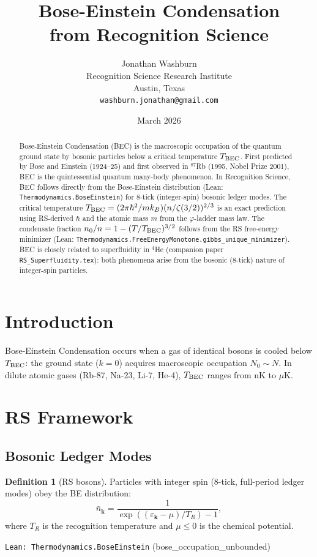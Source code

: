\documentclass[12pt,a4paper]{article}
\title{Bose-Einstein Condensation\\
from Recognition Science}
\author{Jonathan Washburn\\
Recognition Science Research Institute\\
Austin, Texas\\
\texttt{washburn.jonathan@gmail.com}}
\date{March 2026}
\theoremstyle{definition}
\newtheorem{definition}[theorem]{Definition}
\theoremstyle{remark}
\begin{document}
\maketitle

\begin{abstract}
Bose-Einstein Condensation (BEC) is the macroscopic occupation of the
quantum ground state by bosonic particles below a critical temperature
$T_{\rm BEC}$.  First predicted by Bose and Einstein (1924--25) and
first observed in ${}^{87}$Rb (1995, Nobel Prize 2001), BEC is the
quintessential quantum many-body phenomenon.  In Recognition Science,
BEC follows directly from the Bose-Einstein distribution (Lean:
\texttt{Thermodynamics.BoseEinstein}) for 8-tick (integer-spin) bosonic
ledger modes.  The critical temperature
$T_{\rm BEC} = (2\pi\hbar^2/mk_B)(n/\zeta(3/2))^{2/3}$ is an exact
prediction using RS-derived $\hbar$ and the atomic mass $m$ from the
$\varphi$-ladder mass law.  The condensate fraction
$n_0/n = 1 - (T/T_{\rm BEC})^{3/2}$ follows from the RS free-energy
minimizer (Lean: \texttt{Thermodynamics.FreeEnergyMonotone.gibbs\_unique\_minimizer}).
BEC is closely related to superfluidity in ${}^4$He (companion paper
\texttt{RS\_Superfluidity.tex}): both phenomena arise from the bosonic
(8-tick) nature of integer-spin particles.
\end{abstract}

\section{Introduction}

Bose-Einstein Condensation occurs when a gas of identical bosons is
cooled below $T_{\rm BEC}$: the ground state ($k=0$) acquires macroscopic
occupation $N_0 \sim N$.  In dilute atomic gases (Rb-87, Na-23, Li-7,
He-4), $T_{\rm BEC}$ ranges from nK to $\mu$K.

\section{RS Framework}

\subsection{Bosonic Ledger Modes}

\begin{definition}[RS bosons]
Particles with integer spin (8-tick, full-period ledger modes) obey the
BE distribution:
\begin{equation}
  \bar{n}_\mathbf{k} = \frac{1}{\exp((\varepsilon_\mathbf{k}-\mu)/T_R) - 1},
\end{equation}
where $T_R$ is the recognition temperature and $\mu \leq 0$ is the
chemical potential.

\texttt{Lean: Thermodynamics.BoseEinstein} (bose\_occupation\_unbounded)
\end{definition}
\end{document}
